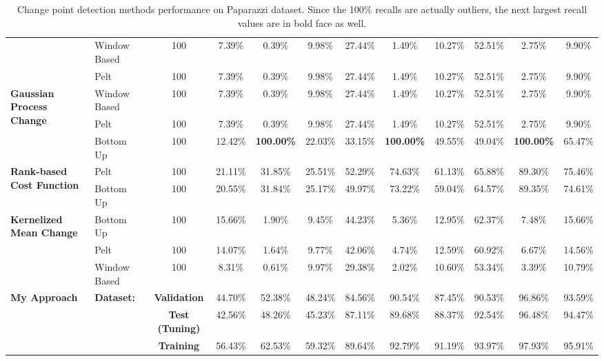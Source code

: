 \begin{table}
{\begin{tabular}{llcccccccccc}
    & Window Based & 100  &  7.39\% &     0.39\% &  9.98\% & 27.44\% &      1.49\% & 10.27\% & 52.51\% &      2.75\% &  9.90\% \\
    & Pelt         & 100  &  7.39\% &     0.39\% &  9.98\% & 27.44\% &      1.49\% & 10.27\% & 52.51\% &      2.75\% &  9.90\% \\ \midrule
\multirow{3}{*}{\textbf{Gaussian Process Change}}
    & Window Based & 100  &  7.39\% &     0.39\% &  9.98\% & 27.44\% &      1.49\% & 10.27\% & 52.51\% &      2.75\% &  9.90\% \\
    & Pelt         & 100  &  7.39\% &     0.39\% &  9.98\% & 27.44\% &      1.49\% & 10.27\% & 52.51\% &      2.75\% &  9.90\% \\
    & Bottom Up    & 100  & 12.42\% &\textbf{100.00\%}& 22.03\% &33.15\% &\textbf{100.00\%}& 49.55\% &        49.04\% &    \textbf{100.00\%} & 65.47\% \\ \midrule
\multirow{2}{*}{\textbf{Rank-based Cost Function}}
    & Pelt         & 100  & 21.11\% &    31.85\% & 25.51\% & 52.29\% &     74.63\% & 61.13\% & 65.88\% &     89.30\% & 75.46\% \\
    & Bottom Up    & 100  & 20.55\% &    31.84\% & 25.17\% & 49.97\% &     73.22\% & 59.04\% & 64.57\% &     89.35\% & 74.61\% \\ \midrule
\multirow{3}{*}{\textbf{Kernelized Mean Change}} 
    & Bottom Up    & 100  & 15.66\% &     1.90\% &  9.45\% & 44.23\% &      5.36\% & 12.95\% & 62.37\% &      7.48\% & 15.66\% \\
    & Pelt         & 100  & 14.07\% &     1.64\% &  9.77\% & 42.06\% &      4.74\% & 12.59\% & 60.92\% &      6.67\% & 14.56\% \\
    & Window Based & 100  &  8.31\% &     0.61\% &  9.97\% & 29.38\% &      2.02\% & 10.60\% & 53.34\% &      3.39\% & 10.79\% \\ \midrule \midrule
\multirow{3}{*}{\textbf{My Approach}} 
    & \multirow{3}{*}{\textbf{Dataset:}}  
         & \textbf{Validation}    &  44.70\% &    52.38\% & 48.24\% &   84.56\% &     90.54\% & 87.45\% &   90.53\% &     96.86\% & 93.59\% \\
    & {} & \textbf{Test (Tuning)} &  42.56\% &    48.26\% & 45.23\% &   87.11\% &     89.68\% & 88.37\% &   92.54\% &     96.48\% & 94.47\% \\
    & {} & \textbf{Training}      &  56.43\% &    62.53\% & 59.32\% &   89.64\% &     92.79\% & 91.19\% &   93.97\% &     97.93\% & 95.91\% \\
\bottomrule
\end{tabular}%
}
    \caption{Change point detection methods performance on Paparazzi dataset. Since the 100\% recalls are actually outliers, the next largest recall values are in bold face as well.}
    \label{tab:cpd_paparazzi}
\end{table}

